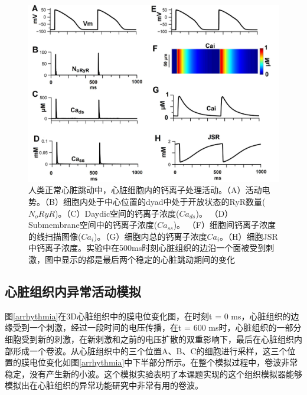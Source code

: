 \begin{figure}[htb]
\includegraphics[width=\textwidth]{figs/calcium.pdf}
\caption{人类正常心脏跳动中，心脏细胞内的钙离子处理活动。（A）活动电势。（B）细胞内处于中心位置的dyad中处于开放状态的RyR数量($N_oRyR$)。（C）Daydic空间的钙离子浓度($Ca_{ds}$)。 （D）Submembrane空间中的钙离子浓度($Ca_{ss}$)。 （F）细胞间钙离子浓度的线扫描图像($Ca_i$)。（G）细胞内总的钙离子浓度$Ca_i$。（H）细胞JSR中钙离子浓度。实验中在500ms时刻心脏组织的边沿一个面被受到刺激，图中显示的都是最后两个稳定的心脏跳动期间的变化}
\label{fig:calciumcell}
\end{figure}

\subsection{心脏组织内异常活动模拟}

图\ref{arrhythmia}在3D心脏组织中的膜电位变化图，在时刻t = 0 ms，心脏组织的边缘受到一个刺激，经过一段时间的电压传播，在t = 600 ms时，心脏组织的一部分细胞受到新的刺激，在新刺激和之前的电压扩散的双重影响下，最后在心脏组织内部形成一个卷波。从心脏组织中的三个位置A、B、C的细胞进行采样，这三个位置的膜电位变化如图\ref{arrhythmia}中下半部分所示。在整个模拟过程中，卷波非常稳定，没有产生新的小波。这个模拟实验表明了本课题实现的这个组织模拟器能够模拟出在心脏组织的异常功能研究中非常有用的卷波。

